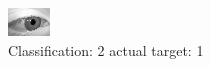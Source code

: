 \begin{figure}[h!]
\begin{center}
\includegraphics[width=0.60\columnwidth]{figures/ID2736_class_2_target_1.png}
\end{center}
\caption{ Classification: 2 actual target: 1}
\label{fig:ID2736_class_2_target_1}
\end{figure}
